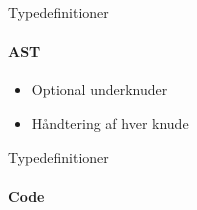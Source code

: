 \begin{frame}{Typedefinitioner}
  \framesubtitle{AST}
  
  \begin{itemize}
    \item Optional underknuder 
    \item Håndtering af hver knude 
  \end{itemize}
\end{frame}

\begin{frame}{Typedefinitioner}
  \framesubtitle{Code}
  \fontsize{7pt}{7.2}\selectfont

\end{frame}


